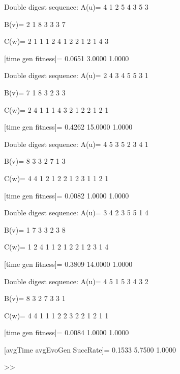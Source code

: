 Double digest sequence:
A(u)=
     4     1     2     5     4     3     5     3

B(v)=
     2     1     8     3     3     3     7

C(w)=
     2     1     1     1     2     4     1     2     2     1     2     1     4     3

[time gen fitness]=
    0.0651    3.0000    1.0000

Double digest sequence:
A(u)=
     2     4     3     4     5     5     3     1

B(v)=
     7     1     8     3     2     3     3

C(w)=
     2     4     1     1     1     4     3     2     1     2     2     1     2     1

[time gen fitness]=
    0.4262   15.0000    1.0000

Double digest sequence:
A(u)=
     4     5     3     5     2     3     4     1

B(v)=
     8     3     3     2     7     1     3

C(w)=
     4     4     1     2     1     2     2     1     2     3     1     1     2     1

[time gen fitness]=
    0.0082    1.0000    1.0000

Double digest sequence:
A(u)=
     3     4     2     3     5     5     1     4

B(v)=
     1     7     3     3     2     3     8

C(w)=
     1     2     4     1     1     2     1     2     2     1     2     3     1     4

[time gen fitness]=
    0.3809   14.0000    1.0000

Double digest sequence:
A(u)=
     4     5     1     5     3     4     3     2

B(v)=
     8     3     2     7     3     3     1

C(w)=
     4     4     1     1     1     2     2     3     2     2     1     2     1     1

[time gen fitness]=
    0.0084    1.0000    1.0000

[avgTime  avgEvoGen  SuccRate]=
    0.1533    5.7500    1.0000

>> 